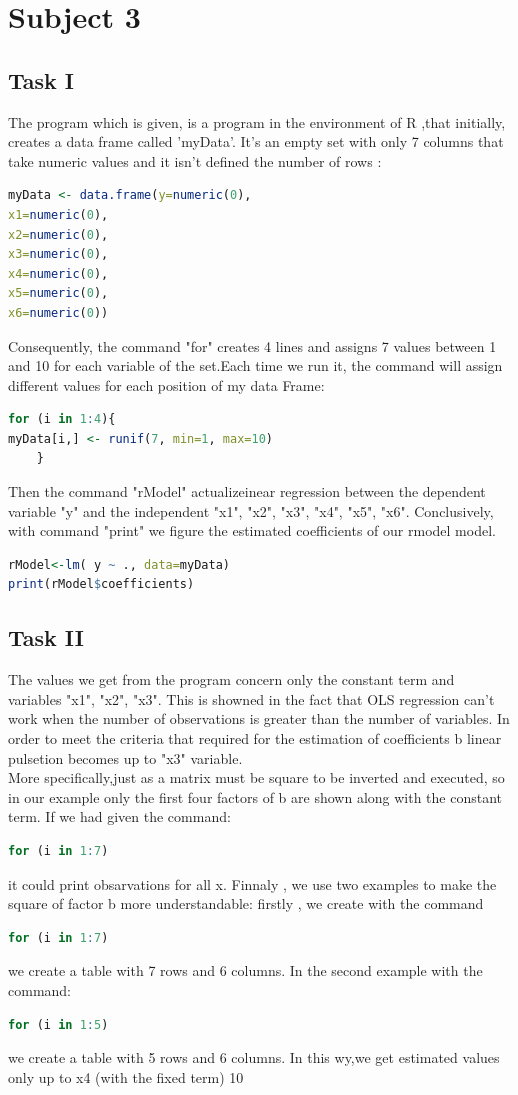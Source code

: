 \documentclass[10pt,a4paper]{article}
\begin{document}
	
	\section{Subject 3}
	\subsection{Task I }
The program which is given, is a program in the  environment of R ,that  initially, creates a data frame called 'myData'. It's an empty set with only 7 columns that take numeric values and it isn’t defined the number of rows :
	\begin{lstlisting}[language=R]
myData <- data.frame(y=numeric(0),
x1=numeric(0), 
x2=numeric(0), 
x3=numeric(0), 
x4=numeric(0), 
x5=numeric(0), 
x6=numeric(0))
	\end{lstlisting}
Consequently, the command "for" creates 4 lines and assigns 7 values between 1 and 10 for each variable of the set.Each time we run it, the command will assign different values for each position of my data Frame:
	\begin{lstlisting}[language=R]
for (i in 1:4){
myData[i,] <- runif(7, min=1, max=10)
	}
	\end{lstlisting}
Then the command "rModel" actualizeinear regression between the dependent variable "y" and the independent "x1", "x2", "x3", "x4", "x5", "x6". Conclusively, with command "print" we figure the estimated coefficients of our rmodel model. 
	\begin{lstlisting}[language=R]
rModel<-lm( y ~ ., data=myData)
print(rModel$coefficients)
	\end{lstlisting}
	\subsection{Task II }
The values ​​we get from the program  concern only the constant term and variables "x1", "x2", "x3". This is showned in the fact that OLS regression can't work when the number of observations is greater than the number of variables. In order to meet the criteria that required for the estimation of coefficients b linear pulsetion becomes up to "x3" variable.\\
More specifically,just as a matrix must be square to be inverted and executed, so in our example only the first four factors of b are shown along with the constant term.
	If we had given the command:
	\begin{lstlisting}[language=R]
for (i in 1:7)
	\end{lstlisting}
it could print obsarvations for all x.
Finnaly , we use two examples to make the square of factor b more understandable:
firstly , we create with the command 
	\begin{lstlisting}[language=R]
for (i in 1:7)
	\end{lstlisting}
we create a table with 7 rows and 6 columns.
In the second example  with the command:
	\begin{lstlisting}[language=R]
for (i in 1:5)
	\end{lstlisting}
we create a table with 5 rows and 6 columns.
In this wy,we get estimated values only up to x4 (with the fixed term) 10
	\newpage
\end{document}
